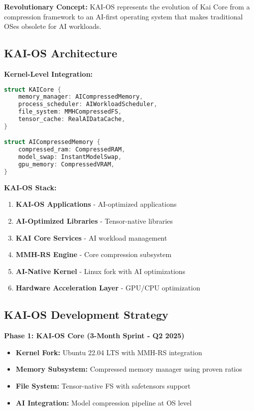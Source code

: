 \documentclass[12pt,a4paper]{article}
\begin{document}
\textbf{Revolutionary Concept:} KAI-OS represents the evolution of Kai Core from a compression framework to an AI-first operating system that makes traditional OSes obsolete for AI workloads.

\subsection{KAI-OS Architecture}

\textbf{Kernel-Level Integration:}
\begin{lstlisting}[language=Rust, caption=KAI-OS Core Architecture]
struct KAICore {
    memory_manager: AICompressedMemory,
    process_scheduler: AIWorkloadScheduler,
    file_system: MMHCompressedFS,
    tensor_cache: RealAIDataCache,
}

struct AICompressedMemory {
    compressed_ram: CompressedRAM,
    model_swap: InstantModelSwap,
    gpu_memory: CompressedVRAM,
}
\end{lstlisting}

\textbf{KAI-OS Stack:}
\begin{enumerate}
    \item \textbf{KAI-OS Applications} - AI-optimized applications
    \item \textbf{AI-Optimized Libraries} - Tensor-native libraries
    \item \textbf{KAI Core Services} - AI workload management
    \item \textbf{MMH-RS Engine} - Core compression subsystem
    \item \textbf{AI-Native Kernel} - Linux fork with AI optimizations
    \item \textbf{Hardware Acceleration Layer} - GPU/CPU optimization
\end{enumerate}

\subsection{KAI-OS Development Strategy}

\textbf{Phase 1: KAI-OS Core (3-Month Sprint - Q2 2025)}
\begin{itemize}
    \item \textbf{Kernel Fork:} Ubuntu 22.04 LTS with MMH-RS integration
    \item \textbf{Memory Subsystem:} Compressed memory manager using proven ratios
    \item \textbf{File System:} Tensor-native FS with safetensors support
    \item \textbf{AI Integration:} Model compression pipeline at OS level
\end{itemize}
\end{document}
